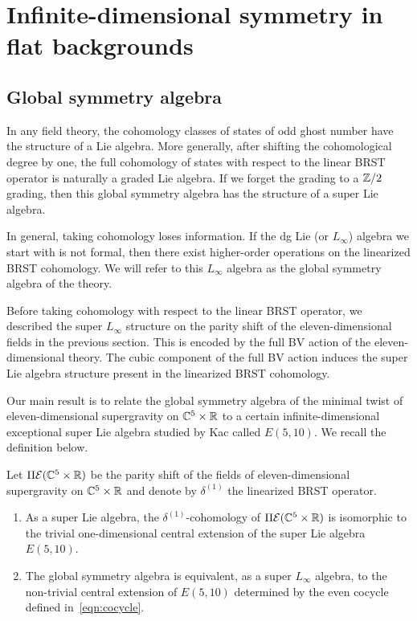 \section{Infinite-dimensional symmetry in flat backgrounds}
\label{s:E(5,10)}

\subsection{Global symmetry algebra}
\label{sec:global}

In any field theory, the cohomology classes of states of odd ghost number have the structure of a Lie algebra. 
More generally, after shifting the cohomological degree by one, the full cohomology of states with respect to the linear BRST operator is naturally a graded Lie algebra. 
If we forget the grading to a $\mathbb Z/2$ grading, then this global symmetry algebra has the structure of a super Lie algebra. 

In general, taking cohomology loses information. 
If the dg Lie (or $L_\infty$) algebra we start with is not formal, then there exist higher-order operations on the linearized BRST cohomology. 
We will refer to this $L_\infty$ algebra as the global symmetry algebra of the theory.

Before taking cohomology with respect to the linear BRST operator, we described the super $L_\infty$ structure on the parity shift of the eleven-dimensional fields in the previous section. 
This is encoded by the full BV action of the eleven-dimensional theory.
The cubic component of the full BV action induces the super Lie algebra structure present in the linearized BRST cohomology. 

Our main result is to relate the global symmetry algebra of the minimal twist of eleven-dimensional supergravity on $\mathbb C^5 \times \mathbb R$ to a certain infinite-dimensional exceptional super Lie algebra studied by Kac \cite{KacBible,KacE510} called $E(5,10)$.
We recall the definition below. 

\begin{thm}\label{thm:global}
Let $\Pi\mathcal E(\mathbb C^5 \times \mathbb R)$ be the parity shift of the fields of eleven-dimensional supergravity on $\mathbb C^5 \times \mathbb R$ and denote by $\delta^{(1)}$ the linearized BRST operator. 
\begin{enumerate}
\item 
As a super Lie algebra, the $\delta^{(1)}$-cohomology of $\Pi\mathcal E(\mathbb C^5 \times \mathbb R)$ is isomorphic to the trivial one-dimensional central extension of the super Lie algebra $E(5,10)$.
\item 
The global symmetry algebra is equivalent, as a super $L_\infty$ algebra, to the non-trivial central extension of $E(5,10)$ determined by the even cocycle defined in~\eqref{eqn:cocycle}. 
\end{enumerate}
\end{thm}

